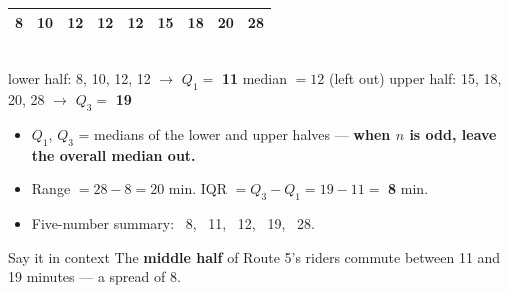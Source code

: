\documentclass[aspectratio=169, 11pt]{beamer}
\newcommand{\redink}[1]{{\color{redacc}\bfseries #1}}
\begin{document}
\begin{frame}[t, plain]
  \vspace{2pt}
  \begin{center}
    \renewcommand{\arraystretch}{1.3}
    \begin{tabular}{|c|c|c|c|c|c|c|c|c|}
      \hline
      8 & 10 & 12 & 12 & \textcolor{goldacc}{\textbf{12}} & 15 & 18 & 20 & 28 \\
      \hline
    \end{tabular}\\[4pt]
    {\small lower half: 8, 10, 12, 12 $\to$ $Q_1 =$ \redink{11} \qquad median $= 12$ (left out)
    \qquad upper half: 15, 18, 20, 28 $\to$ $Q_3 =$ \redink{19}}
  \end{center}
  \begin{itemize}\setlength{\itemsep}{4pt}
    \item $Q_1$, $Q_3$ = medians of the lower and upper halves --- \textbf{when $n$ is odd, leave
          the overall median out.}
    \item Range $= 28 - 8 = 20$ min. \quad IQR $= Q_3 - Q_1 = 19 - 11 =$ \redink{8} min.
    \item Five-number summary: \ 8, \ 11, \ 12, \ 19, \ 28.
  \end{itemize}
  \begin{block}{Say it in context}
    The \textbf{middle half} of Route 5's riders commute between 11 and 19 minutes --- a spread of 8.
  \end{block}
\end{frame}
\end{document}

